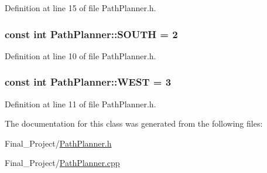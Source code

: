 Definition at line 15 of file Path\-Planner.\-h.

\hypertarget{classPathPlanner_a0d74731cd6e012a8724689f8c8f6492e}{
\subsubsection[{S\-O\-U\-T\-H}]{\setlength{\rightskip}{0pt plus 5cm}const int Path\-Planner\-::\-S\-O\-U\-T\-H = 2\hspace{0.3cm}{\ttfamily [static]}}}\label{classPathPlanner_a0d74731cd6e012a8724689f8c8f6492e}


Definition at line 10 of file Path\-Planner.\-h.

\hypertarget{classPathPlanner_aac8f18908f761050a3801acd476ea0ce}{
\subsubsection[{W\-E\-S\-T}]{\setlength{\rightskip}{0pt plus 5cm}const int Path\-Planner\-::\-W\-E\-S\-T = 3\hspace{0.3cm}{\ttfamily [static]}}}\label{classPathPlanner_aac8f18908f761050a3801acd476ea0ce}


Definition at line 11 of file Path\-Planner.\-h.



The documentation for this class was generated from the following files\-:\begin{DoxyCompactItemize}
\item 
Final\-\_\-\-Project/\hyperlink{PathPlanner_8h}{Path\-Planner.\-h}\item 
Final\-\_\-\-Project/\hyperlink{PathPlanner_8cpp}{Path\-Planner.\-cpp}\end{DoxyCompactItemize}
